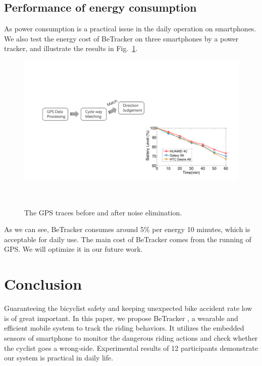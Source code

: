 \documentclass{sigchi-ext}
\def\sysname{BeTracker }
\begin{document}
\subsection{Performance of energy consumption}
As power consumption is a practical issue in the daily operation on smartphones. We also test the energy cost of \sysname on three smartphones by a power tracker, and illustrate the results in Fig.~\ref{fig:battery}.
\begin{figure}[h]
	\centering
	\includegraphics[width=0.6\columnwidth]{figures/battery.pdf}
	\caption{The GPS traces before and after noise elimination.}~\label{fig:battery}
\end{figure}
As we can see, \sysname consumes around 5\% per energy 10 minutes, which is acceptable for daily use.
The main cost of \sysname comes from the running of GPS. We will optimize it in our future work.

\section{Conclusion}
Guaranteeing the bicyclist safety and keeping unexpected bike accident rate low is of great important. In this paper, we propose \sysname, a wearable and efficient mobile system to track the riding behaviors. It utilizes the embedded sensors of smartphone to monitor the dangerous riding actions and check whether the cyclist goes a wrong-side. Experimental results of 12 participants demonstrate our system is practical in daily life. 
\end{document}
